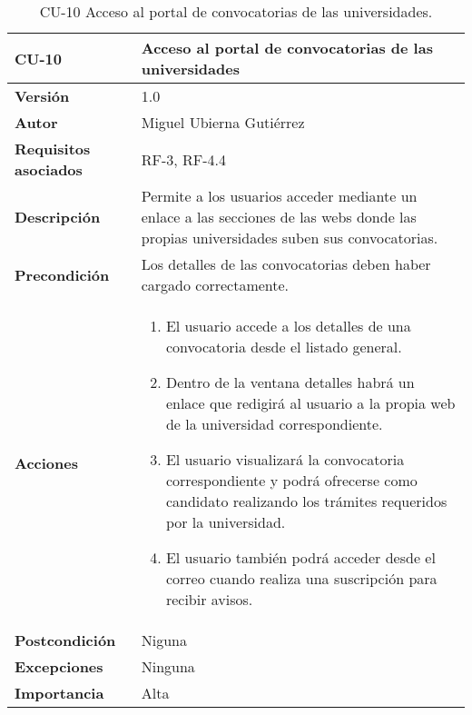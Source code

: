 \begin{table}[p]
	\centering
	\begin{tabularx}{\linewidth}{ p{} p{} }
		\toprule
		\textbf{CU-10}    & \textbf{Acceso al portal de convocatorias de las universidades}\\
		\toprule
		\textbf{Versión}              & 1.0    \\
		\textbf{Autor}                & Miguel Ubierna Gutiérrez \\
		\textbf{Requisitos asociados} & RF-3, RF-4.4 \\
		\textbf{Descripción}          & Permite a los usuarios acceder mediante un enlace a las secciones de las webs donde las propias universidades suben sus convocatorias.  \\
		\textbf{Precondición}         & Los detalles de las convocatorias deben haber cargado correctamente.\\
		\textbf{Acciones}             &
		\begin{enumerate}
			\def\labelenumi{\arabic{enumi}.}
			\tightlist
			\item El usuario accede a los detalles de una convocatoria desde el listado general.
                \item Dentro de la ventana detalles habrá un enlace que redigirá al usuario a la propia web de la universidad correspondiente.
                \item El usuario visualizará la convocatoria correspondiente y podrá ofrecerse como candidato realizando los trámites requeridos por la universidad.
                \item El usuario también podrá acceder desde el correo cuando realiza una suscripción para recibir avisos.                
		\end{enumerate}\\
		\textbf{Postcondición}        & Niguna \\
		\textbf{Excepciones}          & Ninguna  \\
		\textbf{Importancia}          & Alta  \\
		\bottomrule
	\end{tabularx}
	\caption{CU-10 Acceso al portal de convocatorias de las universidades.}
\end{table}


